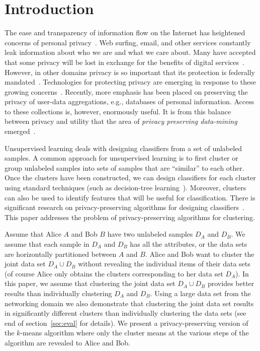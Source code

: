 
\section{Introduction}

The ease and transparency of information flow on the Internet has
heightened concerns of personal privacy~\cite{cra99,tur03}.  Web
surfing, email, and other services constantly leak information about
who we are and what we care about.  Many have accepted that some
privacy will be lost in exchange for the benefits of digital
services~\cite{tay03}.  However, in other domains privacy is so
important that its protection is federally mandated~\cite{hippa}.
Technologies for protecting privacy are
emerging in response to these growing
concerns~\cite{p3p02,gwb97,rks+97}.  Recently, more emphasis has been placed on preserving the
privacy of user-data aggregations, e.g., databases of personal
information.  Access to these  collections is, however, enormously
useful.  It is from this balance between privacy and utility that the
area of {\it privacy preserving data-mining}
emerged~\cite{Agrawal-Srikant,Lindell-Pinkas}.



Unsupervised learning deals with designing classifiers from a set of
unlabeled samples. A common approach for unsupervised learning is to
first cluster or group unlabeled samples into sets of samples that are
``similar'' to each other. Once the clusters have been constructed, we
can design classifiers for each cluster using standard techniques
(such as decision-tree
learning~\cite{Mitchell:AI,Quinlan:86}). Moreover, clusters can also
be used to identify features that will be useful for
classification. There is significant research on privacy-preserving
algorithms for designing
classifiers~\cite{Agrawal-Srikant,Lindell-Pinkas}. This paper
addresses the problem of privacy-preserving algorithms for clustering.



Assume that Alice $A$ and Bob $B$ have two unlabeled samples $D_A$ and
$D_B$. We assume that each sample in $D_A$ and $D_B$ has all the
attributes, or the data sets are horizontally partitioned between $A$
and $B$. Alice and Bob want to cluster the joint data set $D_A \cup
D_B$ without revealing the individual items of their data sets (of
course Alice only obtains the clusters corresponding to her data set
$D_A$). In this paper, we assume that clustering the joint data set
$D_A \cup D_B$ provides better results than individually clustering
$D_A$ and $D_B$.  Using a large data set from the networking domain we also demonstrate
that clustering the joint data set results in significantly different
clusters than individually clustering the data sets (see end of
section~\ref{sec:eval} for details). We present a privacy-preserving
version of the $k$-means algorithm where only the cluster means at the
various steps of the algorithm are revealed to Alice and Bob.


